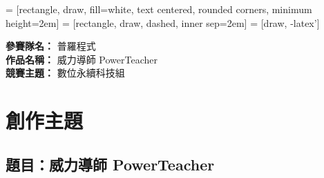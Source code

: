 \documentclass[12pt]{article}
\begin{document}
\setlength{\parskip}{-6pt}
\date{}
\usetikzlibrary{automata, positioning, arrows, shapes, fit}
{}
 = [rectangle, draw, fill=white, 
    text centered, rounded corners, minimum height=2em]
 = [rectangle, draw, dashed, inner sep=2em]
 = [draw, -latex']
\setlength{\parindent}{2em}

\noindent
\textbf{參賽隊名：} 普羅程式 \\
\textbf{作品名稱：} 威力導師 PowerTeacher \\
\textbf{競賽主題：} 數位永續科技組

\section{創作主題}
\subsection{題目：威力導師 PowerTeacher}
\end{document}
